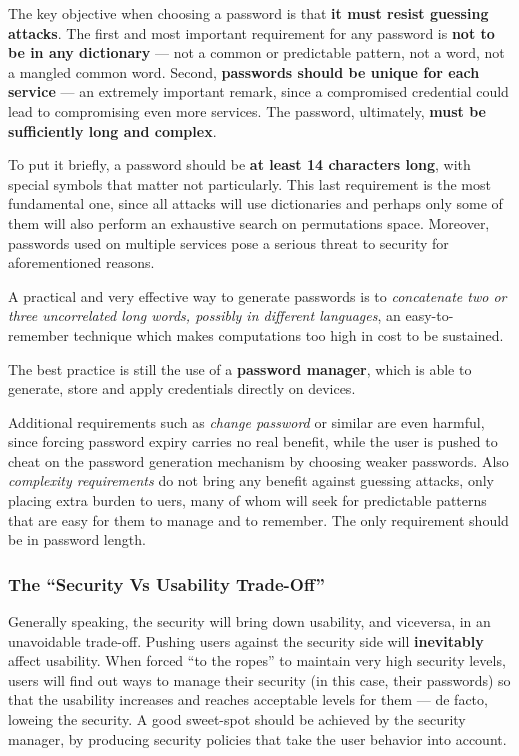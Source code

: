 \documentclass[10pt]{extreport}
\begin{document}
The key objective when choosing a password is that \textbf{it must resist
guessing attacks}. The first and most important requirement for any password is
\textbf{not to be in any dictionary} --- not a common or predictable pattern,
not a word, not a mangled common word. Second, \textbf{passwords should be
unique for each service} --- an extremely important remark, since a compromised
credential could lead to compromising even more services. The password,
ultimately, \textbf{must be sufficiently long and complex}.

To put it briefly, a password should be \textbf{at least 14 characters long},
with special symbols that matter not particularly. This last requirement is the
most fundamental one, since all attacks will use dictionaries and perhaps only
some of them will also perform an exhaustive search on permutations space. Moreover,
passwords used on multiple services pose a serious threat to security for
aforementioned reasons.

A practical and very effective way to generate passwords is to
\emph{concatenate two or three uncorrelated long words, possibly in different
languages}, an easy\--to\--remember technique which makes computations too high
in cost to be sustained.

The best practice is still the use of a \textbf{password manager}, which is
able to generate, store and apply credentials directly on devices.

Additional requirements such as \emph{change password} or similar are even
harmful, since forcing password expiry carries no real benefit, while the user
is pushed to cheat on the password generation mechanism by choosing weaker
passwords. Also \emph{complexity requirements} do not bring any benefit against
guessing attacks, only placing extra burden to uers, many of whom will seek for
predictable patterns that are easy for them to manage and to remember. The only
requirement should be in password length.

\subsubsection{The ``Security Vs Usability Trade\--Off''}

Generally speaking, the security will bring down usability, and viceversa, in
an unavoidable trade\--off. Pushing users against the security side will
\textbf{inevitably} affect usability. When forced ``to the ropes'' to maintain
very high security levels, users will find out ways to manage their security
(in this case, their passwords) so that the usability increases and reaches
acceptable levels for them --- de facto, loweing the security. A good
sweet\--spot should be achieved by the security manager, by producing security
policies that take the user behavior into account.
\end{document}
